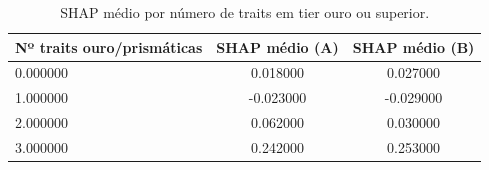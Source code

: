 \begin{table}[htbp]
\caption{SHAP médio por número de traits em tier ouro ou superior.}
\label{tab:h1mono}
\centering
\small
\begin{tabular}{lcc}
\toprule
Nº traits ouro/prismáticas & SHAP médio (A) & SHAP médio (B) \\
\midrule
0.000000 & 0.018000 & 0.027000 \\
1.000000 & -0.023000 & -0.029000 \\
2.000000 & 0.062000 & 0.030000 \\
3.000000 & 0.242000 & 0.253000 \\
\bottomrule
\end{tabular}
\end{table}
